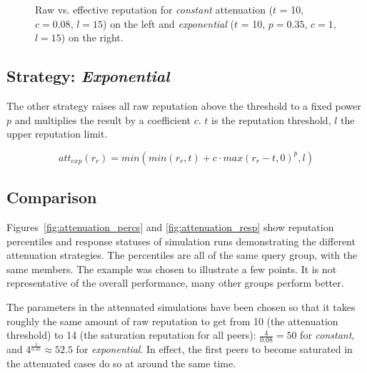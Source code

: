 \begin{figure}[t]
\centering
{}%
\caption{Raw vs. effective reputation for \emph{constant} attenuation ($t$ = 10,
$c = 0.08$, $l = 15$) on the left and \emph{exponential} ($t$ = 10, $p = 0.35$,
$c = 1$, $l = 15$) on the right.}
\label{fig:att_raw_vs_eff}
\end{figure}

\subsection{Strategy: \emph{Exponential}}
The other strategy raises all raw reputation above the threshold to a fixed
power $p$ and multiplies the result by a coefficient $c$. $t$ is the reputation
threshold, $l$ the upper reputation limit.

\[att_{exp}(r_r) = min(min(r_r, t) + c \cdot max(r_r - t, 0)^p, l)\]

\subsection{Comparison}
Figures~\ref{fig:attenuation_percs} and \ref{fig:attenuation_resp} show
reputation percentiles and response statuses of simulation runs demonstrating
the different attenuation strategies. The percentiles are all of the same query
group, with the same members. The example was chosen to illustrate a few points.
It is not representative of the overall performance, many other groups perform
better.

The parameters in the attenuated simulations have been chosen so that it takes
roughly the same amount of raw reputation to get from 10 (the attenuation
threshold) to 14 (the saturation reputation for all peers): $\frac{4}{0.08} =
50$ for \emph{constant}, and $4^{\frac{1}{0.35}} \approx 52.5$ for
\emph{exponential}. In effect, the first peers to become saturated in the
attenuated cases do so at around the same time.

